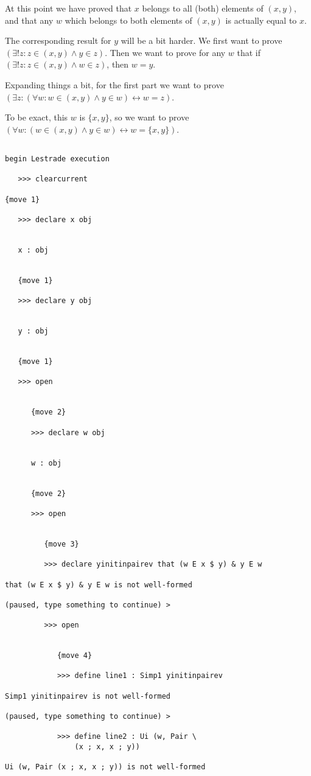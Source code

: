 \documentclass[12pt]{article}
\begin{document}
At this point we have proved that $x$ belongs to all (both) elements of $(x,y)$, and that any $w$ which belongs to both elements of $(x,y)$ is actually equal to $x$.

The corresponding result for $y$ will be a bit harder.  We first want to prove $(\exists! z: z \in (x,y) \wedge y \in z)$.
Then we want to prove for any $w$ that if $(\exists! z: z \in (x,y) \wedge w \in z)$, then $w=y$.

Expanding things a bit, for the first part we want to prove $(\exists z:(\forall w: w \in (x,y) \wedge y \in w) \leftrightarrow w=z)$.

To be exact, this $w$ is $\{x,y\}$, so we want to prove $(\forall w: (w \in (x,y) \wedge y \in w) \leftrightarrow w = \{x,y\})$.

\begin{verbatim}

begin Lestrade execution

   >>> clearcurrent

{move 1}

   >>> declare x obj


   x : obj


   {move 1}

   >>> declare y obj


   y : obj


   {move 1}

   >>> open


      {move 2}

      >>> declare w obj


      w : obj


      {move 2}

      >>> open


         {move 3}

         >>> declare yinitinpairev that (w E x $ y) & y E w

that (w E x $ y) & y E w is not well-formed

(paused, type something to continue) >

         >>> open


            {move 4}

            >>> define line1 : Simp1 yinitinpairev

Simp1 yinitinpairev is not well-formed

(paused, type something to continue) >

            >>> define line2 : Ui (w, Pair \
                (x ; x, x ; y))

Ui (w, Pair (x ; x, x ; y)) is not well-formed


\end{verbatim}
\end{document}
